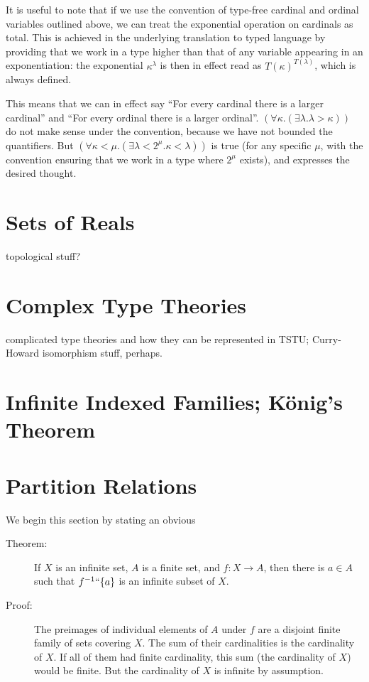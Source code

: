\documentclass[12pt]{book}
\begin{document}
It is useful to note that if we use the convention of type-free
cardinal and ordinal variables outlined above, we can treat the
exponential operation on cardinals as total.  This is achieved in the
underlying translation to typed language by providing that we work in
a type higher than that of any variable appearing in an
exponentiation: the exponential $\kappa^{\lambda}$ is then in effect
read as $T(\kappa)^{T(\lambda)}$, which is always defined.

This means that we can in effect say ``For every cardinal there is a
larger cardinal'' and ``For every ordinal there is a larger ordinal''.
$(\forall \kappa.(\exists \lambda.\lambda > \kappa))$ do not make
sense under the convention, because we have not bounded the
quantifiers.  But $(\forall \kappa < \mu.(\exists
\lambda<2^{\mu}.\kappa<\lambda))$ is true (for any specific $\mu$,
with the convention ensuring that we work in a type where $2^{\mu}$
exists), and expresses the desired thought.

\section{Sets of Reals}

topological stuff?

\section{Complex Type Theories}

complicated type theories and how they can be represented in TSTU;
Curry-Howard isomorphism stuff, perhaps.

\section{Infinite Indexed Families; K\"onig's Theorem}

\section{Partition Relations}

We begin this section by stating an obvious 

\begin{description}

\item[Theorem:] If $X$ is an infinite set, $A$ is a finite set, and
$f:X\rightarrow A$, then there is $a \in A$ such that $f^{-1}``\{a\}$
is an infinite subset of $X$.

\item[Proof:] The preimages of individual elements of $A$ under $f$
are a disjoint finite family of sets covering $X$.  The sum of their
cardinalities is the cardinality of $X$.  If all of them had finite
cardinality, this sum (the cardinality of $X$) would be finite.  But
the cardinality of $X$ is infinite by assumption.

\end{description}
\end{document}
